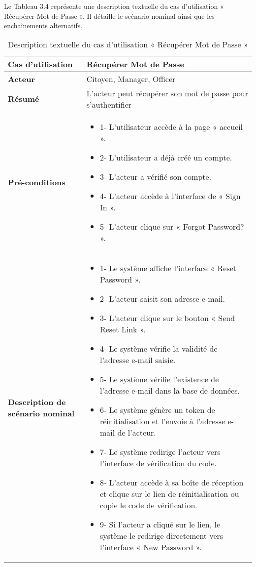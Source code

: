 Le Tableau 3.4 représente une description textuelle du cas d'utilisation « Récupérer Mot de Passe ». Il détaille le scénario nominal ainsi que les enchaînements alternatifs.
\begin{longtable}{|>{\arraybackslash}p{4.2cm}|>{\arraybackslash}p{12.5cm}|}
\caption{\centering Description textuelle du cas d'utilisation « Récupérer Mot de Passe »}
\label{tab:backlog} \\
\hline
\rowcolor{gray!20}
\textbf{Cas d'utilisation} &  Récupérer Mot de Passe \\
\hline
\endfirsthead

\hline
\endhead

\hline
\endfoot

\hline \hline
\endlastfoot
\textbf{Acteur} & Citoyen, Manager, Officer \\
\hline
\textbf{Résumé} &  L'acteur peut récupérer son mot de passe pour s'authentifier \\
\hline
\textbf{Pré-conditions} &

\begin{itemize}[label=]
\item{1-} L'utilisateur accède à la page « accueil ».
\item{2-} L'utilisateur a déjà créé un compte.
\item{3-} L'acteur a vérifié son compte.
\item{4-} L'acteur accède à l'interface de « Sign In ».
\item{5-} L'acteur clique sur « Forgot Password? ».
\end{itemize}

\\
\hline
\textbf{Description de scénario nominal }  &
\begin{itemize}[label=]
\item{1-} Le système affiche l'interface « Reset Password ».
\item{2-} L'acteur saisit son adresse e-mail.
\item{3-} L'acteur clique sur le bouton « Send Reset Link ».
\item{4-} Le système vérifie la validité de l'adresse e-mail saisie.
\item{5-} Le système vérifie l'existence de l'adresse e-mail dans la base de données.
\item{6-} Le système génère un token de réinitialisation et l'envoie à l'adresse e-mail de l'acteur.
\item{7-} Le système redirige l'acteur vers l'interface de vérification du code.
\item{8-} L'acteur accède à sa boîte de réception et clique sur le lien de réinitialisation ou copie le code de vérification.
\item{9-} Si l'acteur a cliqué sur le lien, le système le redirige directement vers l'interface « New Password ».



\end{itemize}
\end{longtable}
